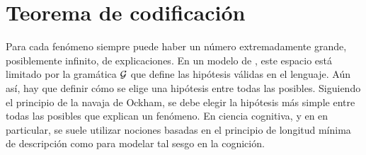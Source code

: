 \section{Teorema de codificación}
\label{sec:coding}


Para cada fenómeno siempre puede haber un número extremadamente grande, posiblemente infinito, de explicaciones. En un modelo de \lot, este espacio está limitado por la gramática $\gram$ que define las hipótesis válidas en el lenguaje. Aún así, hay que definir cómo se elige una hipótesis entre todas las posibles. Siguiendo el principio de la navaja de Ockham, se debe elegir la hipótesis más simple entre todas las posibles que explican un fenómeno. En ciencia cognitiva, y en \gramgeo en particular, se suele utilizar nociones basadas en el principio de longitud mínima de descripción como \mdlgeo para modelar tal sesgo en la cognición.


